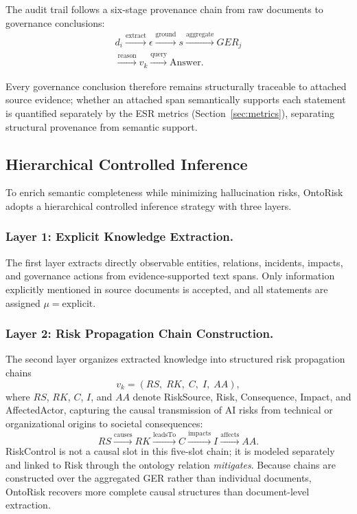 \documentclass[a4paper,fleqn]{cas-dc}
\begin{document}
The audit trail follows a six-stage provenance chain from raw
documents to governance conclusions:
\begin{equation}
\begin{aligned}
d_i \xrightarrow{\text{extract}} \epsilon \xrightarrow{\text{ground}} s
\xrightarrow{\text{aggregate}} \mathit{GER}_j \\
\xrightarrow{\text{reason}} v_k \xrightarrow{\text{query}} \text{Answer}.
\end{aligned}
\end{equation}

Every governance conclusion therefore remains structurally traceable
to attached source evidence; whether an attached span semantically
supports each statement is quantified separately by the ESR metrics
(Section~\ref{sec:metrics}), separating structural provenance from
semantic support.

\subsection{Hierarchical Controlled Inference}

To enrich semantic completeness while minimizing hallucination risks,
OntoRisk adopts a hierarchical controlled inference strategy
with three layers.

\subsubsection{Layer 1: Explicit Knowledge Extraction.}
The first layer extracts directly observable entities, relations,
incidents, impacts, and governance actions from evidence-supported
text spans.
Only information explicitly mentioned in source documents is accepted,
and all statements are assigned $\mu = \text{explicit}$.

\subsubsection{Layer 2: Risk Propagation Chain Construction.}
The second layer organizes extracted knowledge into structured risk
propagation chains
\begin{equation}
  v_k = (RS,\; RK,\; C,\; I,\; AA),
\end{equation}
where $RS$, $RK$, $C$, $I$, and $AA$ denote RiskSource, Risk,
Consequence, Impact, and AffectedActor, capturing the causal
transmission of AI risks from technical or organizational origins to
societal consequences:
\begin{equation}
  RS \xrightarrow{\text{causes}} RK
     \xrightarrow{\text{leadsTo}} C
     \xrightarrow{\text{impacts}} I
     \xrightarrow{\text{affects}} AA.
\end{equation}
RiskControl is not a causal slot in this five-slot chain; it is
modeled separately and linked to Risk through the ontology relation
\textit{mitigates}.
Because chains are constructed over the aggregated GER rather than
individual documents, OntoRisk recovers more complete causal
structures than document-level extraction.
\end{document}

